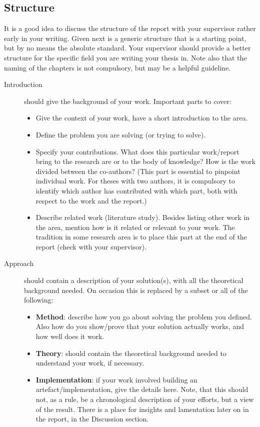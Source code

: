\documentclass[nofilelist]{cslthse-msc}
\begin{document}
\begin{appendices}
\chapter{Structure}
It is a good idea to discuss the structure of the report with your supervisor rather early in your writing. Given next is a generic structure that is a starting point, but by no means the absolute standard. Your supervisor should provide a better structure for the specific field you are writing your thesis in. Note also that the naming of the chapters is not compulsory, but may be a helpful guideline.
\begin{description}
\item[Introduction] should give the background of your work. Important parts to cover:
\begin{itemize}
\item Give the context of your work, have a short introduction to the area.
\item Define the problem you are solving (or trying to solve).
\item Specify your contributions. What does this particular work/report bring to the research are or to the body of knowledge? How is the work divided between the co-authors? (This part is essential to pinpoint individual work. For theses with two authors, it is compulsory to identify which author has contributed with which part, both with respect to the work and the report.)
\item Describe related work (literature study). Besides listing other work in the area, mention how is it related or relevant to your work. The tradition in some research area is to place this part at the end of the report (check with your supervisor).
\end{itemize}
\item[Approach] should contain a description of your solution(s), with all the theoretical background needed. On occasion this is replaced by a subset or all of the following:
\begin{itemize}
\item \textbf{Method}: describe how you go about solving the problem you defined. Also how do you show/prove that your solution actually works, and how well does it work.
\item \textbf{Theory}: should contain the theoretical background needed to understand your work, if necessary.
\item \textbf{Implementation}: if your work involved building an artefact/implementation, give the details here. Note, that this should not, as a rule, be a chronological description of your efforts, but a view of the result. There is a place for insights and lamentation later on in the report, in the Discussion section.

\end{itemize}
\end{description}
\end{appendices}
\end{document}

